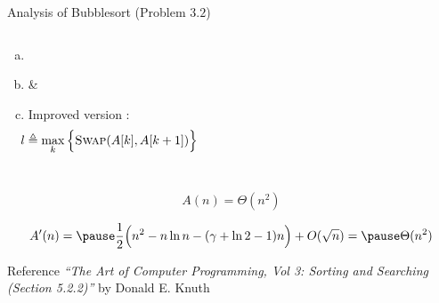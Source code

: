 \begin{frame}{}
  \begin{exampleblock}{Analysis of Bubblesort (Problem $3.2$)}
    \begin{columns}
	\begin{enumerate}[(a)]
	  \item {}
	  \item {} \& 
	  \item Improved version :
	    \[
	      \!\!\!\! l \triangleq \max_{k} \Big\{\textsc{Swap}(A[k], A[k+1])\Big\}
	    \]
	\end{enumerate}
	
    \end{columns}
  \end{exampleblock}

  \pause
  \[
    A(n) = \Theta(n^2)
  \]

  \pause
  \vspace{-0.30cm}
  \[
    A'(n) = \pause \frac{1}{2} \Big(n^2 - n \ln n - (\gamma + \ln 2 - 1) n \Big) + O(\sqrt{n}) = \pause \Theta(n^2)
  \]

  \pause
  \vspace{-0.50cm}
  \begin{alertblock}{Reference}
    {\it ``The Art of Computer Programming, Vol 3: Sorting and Searching (Section 5.2.2)''} by Donald E. Knuth
  \end{alertblock}
\end{frame}
